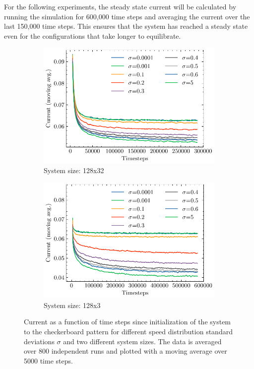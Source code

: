 \\
\\
For the following experiments, the steady state current will be calculated by running the simulation for 600,000 time steps and averaging the current over the last 150,000 time steps. This ensures that the system has reached a steady state even for the configurations that take longer to equilibrate.
\\
\begin{figure}[H]
    \centering
    \begin{subfigure}{\textwidth}
        \centering
        \includegraphics{currents_fixed_sigma_128x32}
        \caption{System size: 128x32}
        \label{fig:currents_fixed_sigma_128x32}
    \end{subfigure}
    \par\vspace{1cm}
    \begin{subfigure}{\textwidth}
        \centering
        \includegraphics{currents_fixed_sigma_128x3}
        \caption{System size: 128x3}
        \label{fig:currents_fixed_sigma_128x3}
    \end{subfigure}
    \caption{Current as a function of time steps since initialization of the system to the checkerboard pattern for different speed distribution standard deviations $\sigma$ and two different system sizes. The data is averaged over 800 independent runs and plotted with a moving average over 5000 time steps.}
\end{figure}


